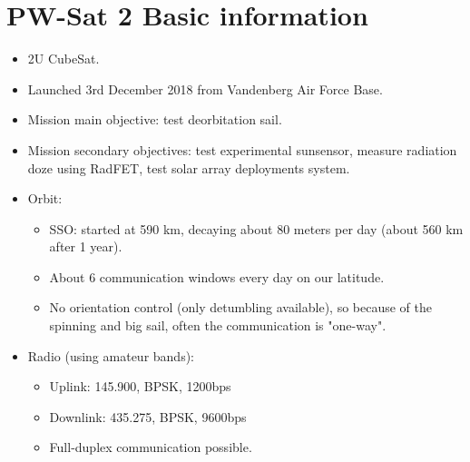\section{PW-Sat 2 Basic information}

\begin{itemize}
 \item 2U CubeSat.
 \item Launched 3rd December 2018 from Vandenberg Air Force Base.
 \item Mission main objective: test deorbitation sail.
 \item Mission secondary objectives: test experimental sunsensor, measure radiation doze using RadFET, test solar array deployments system.
 \item Orbit:
 \begin{itemize}
	\item SSO: started at 590 km, decaying about 80 meters per day (about 560 km after 1 year).
	\item About 6 communication windows every day on our latitude. 
	\item No orientation control (only detumbling available), so because of the spinning and big sail, often the communication is "one-way".
 \end{itemize}
 \item Radio (using amateur bands):
 \begin{itemize}         
	\item Uplink: 145.900, BPSK, 1200bps
    \item Downlink: 435.275, BPSK, 9600bps 
    \item Full-duplex communication possible.
 \end{itemize}
\end{itemize}